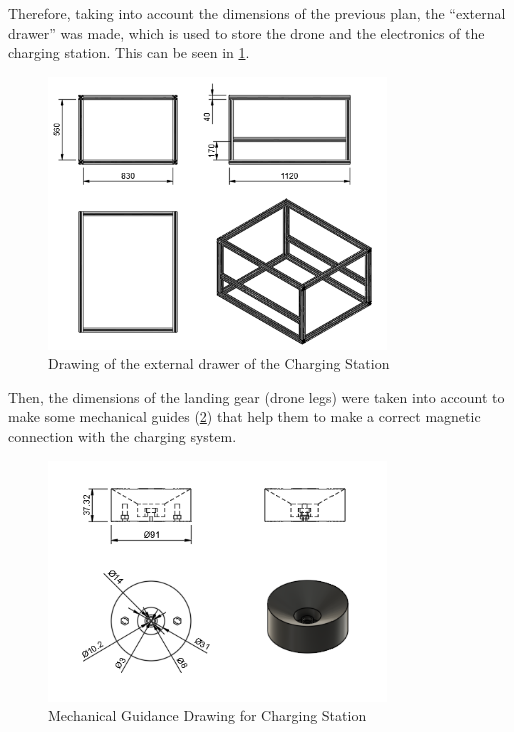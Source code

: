             Therefore, taking into account the dimensions of the previous plan, the “external drawer” was made, which is used to store the drone and the electronics of the charging station. This can be seen in \ref{fig:etiqueta2}.           
            \begin{figure}[htpb]
                \centering
                \includegraphics[width=0.8\textwidth]{pictures/PLANOS_CAJON_EXTERNO_1.png}
                \caption{Drawing of the external drawer of the Charging Station}
                \label{fig:etiqueta2}
            \end{figure}

            Then, the dimensions of the landing gear (drone legs) were taken into account to make some mechanical guides (\ref{fig:etiqueta3}) that help them to make a correct magnetic connection with the charging system.            \begin{figure}[htpb]
                \centering
                \includegraphics[width=0.8\textwidth]{pictures/PLANO_GUIAS_MECANICAS.png}
                \caption{Mechanical Guidance Drawing for Charging Station}
                \label{fig:etiqueta3}
            \end{figure}


